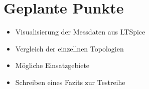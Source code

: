 \section{Geplante Punkte}


\begin{itemize}
  \item Visualisierung der Messdaten aus LTSpice
  \item Vergleich der einzellnen Topologien
  \item Mögliche Einsatzgebiete
  \item Schreiben eines Fazits zur Testreihe
\end{itemize}

